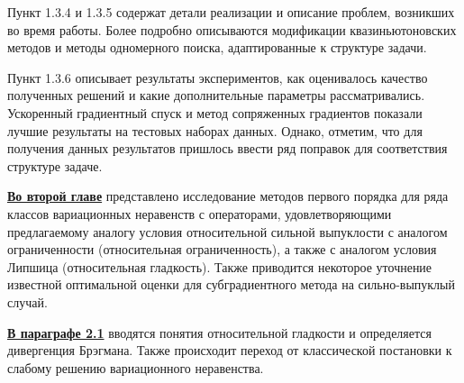 \begin{table}[h]
\caption{Сравнение характеристик методов}
\label{tabular:timesandtenses}
\centering
{}
\end{table}

Пункт 1.3.4 и 1.3.5 содержат детали реализации и описание проблем, возникших во время работы. Более подробно описываются модификации квазиньютоновских методов и методы одномерного поиска, адаптированные к структуре задачи.

Пункт 1.3.6 описывает результаты экспериментов, как оценивалось качество полученных решений и какие дополнительные параметры рассматривались. Ускоренный градиентный спуск и метод сопряженных градиентов показали лучшие результаты на тестовых наборах данных. Однако, отметим, что для получения данных результатов пришлось ввести ряд поправок для соответствия структуре задаче. 

\underline{\textbf{Во второй главе}} представлено исследование методов первого порядка для ряда классов вариационных неравенств с операторами, удовлетворяющими предлагаемому аналогу условия относительной сильной выпуклости с аналогом ограниченности (относительная ограниченность), а также с аналогом условия Липшица (относительная гладкость). Также приводится некоторое уточнение известной оптимальной оценки для субградиентного метода \cite{Bach_2012} на сильно-выпуклый случай. 

\underline{\textbf{В параграфе 2.1}} вводятся понятия относительной гладкости и определяется дивергенция Брэгмана. Также происходит переход от классической постановки к слабому решению вариационного неравенства. 

